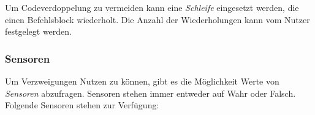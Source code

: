 Um Codeverdoppelung zu vermeiden kann eine \emph{Schleife} eingesetzt werden, die einen Befehlsblock wiederholt. Die Anzahl der Wiederholungen kann vom Nutzer festgelegt werden.

\subsubsection{Sensoren}
\label{sec:implementation:program:elements:sensors}

Um Verzweigungen Nutzen zu können, gibt es die Möglichkeit Werte von \emph{Sensoren} abzufragen. Sensoren stehen immer entweder auf Wahr oder Falsch. Folgende Sensoren stehen zur Verfügung:


